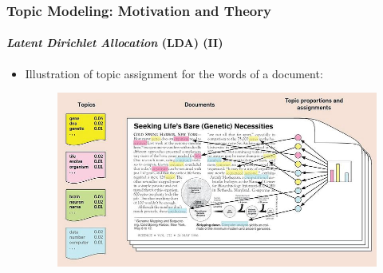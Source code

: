 \documentclass[xcolor=dvipsnames]{beamer}
\begin{document}
\begin{frame}
\frametitle{Topic Modeling: Motivation and Theory}
\framesubtitle{\textit{Latent Dirichlet Allocation} (LDA) (II)}
\begin{itemize}
\vspace{-0.5cm}
\item Illustration of topic assignment for the words of a document: \cite{blei2012probabilistic}
	\vspace{-0.5cm}
	\begin{figure}[h!]
  	\centering
  	\includegraphics[scale = 0.4]{../plots/presentation/lda_topic_assignment.jpeg}
	\end{figure}
\end{itemize}
\end{frame}
\end{document}
